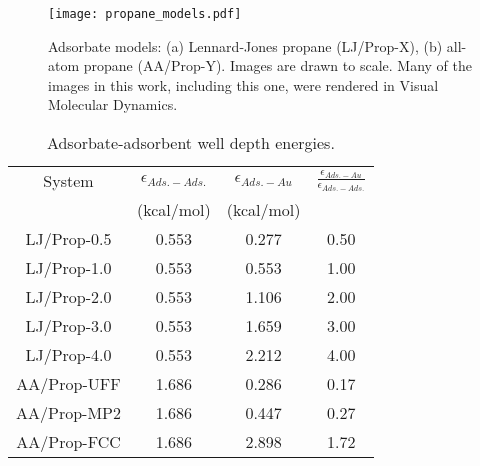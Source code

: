 \documentclass[10pt]{report}  %
\newcommand{\T}{\rule{0pt}{2.6ex}}
\newcommand{\B}{\rule[-1.2ex]{0pt}{0pt}}
\begin{document}
%
%
\begin{figure}[]
	\centering
	\texttt{[image: propane\_models.pdf]}
	\caption{Adsorbate models: (a) Lennard-Jones propane (LJ/Prop-X), (b) all-atom propane (AA/Prop-Y).  Images are drawn to scale. Many of the images in this work, including this one, were rendered in Visual Molecular Dynamics. \protect\cite{Humphrey:1996}}
	\label{fig:models}
\end{figure}

%
%
\begin{table} []
\caption{Adsorbate-adsorbent well depth energies.}
\centering
\begin{tabular}{ c c c c }
	\hline
        \hline
System \T \B & $\epsilon_{Ads.-Ads.}$ & $\epsilon_{Ads.-Au}$ & $\frac{\epsilon_{Ads.-Au}}{\epsilon_{Ads.-Ads.}}$ \\
 \T \B & (kcal/mol) & (kcal/mol) & \\
	\hline
LJ/Prop-0.5 \T \B & 0.553 & 0.277 & 0.50 \\
LJ/Prop-1.0 \T \B & 0.553 & 0.553 & 1.00 \\
LJ/Prop-2.0 \T \B & 0.553 & 1.106 & 2.00 \\
LJ/Prop-3.0 \T \B & 0.553 & 1.659 & 3.00 \\
LJ/Prop-4.0 \T \B & 0.553 & 2.212 & 4.00 \\
          \hline
AA/Prop-UFF \T \B & 1.686 & 0.286 & 0.17 \\
AA/Prop-MP2 \T \B & 1.686 & 0.447 & 0.27  \\
AA/Prop-FCC \T \B & 1.686 & 2.898 & 1.72  \\
	\hline
        \hline
\end{tabular}
\label{table:energies}
\end{table}
\end{document}
